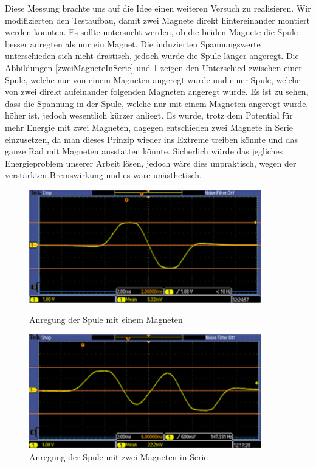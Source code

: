 Diese Messung brachte uns auf die Idee einen weiteren Versuch zu realisieren. Wir modifizierten den Testaufbau, damit zwei Magnete direkt hintereinander montiert werden konnten. Es sollte untersucht werden, ob die beiden Magnete die Spule besser anregten als nur ein Magnet. Die induzierten Spannungswerte unterschieden sich nicht drastisch, jedoch wurde die Spule länger angeregt. Die Abbildungen \ref{zweiMagneteInSerie} und \ref{manu} zeigen den Unterschied zwischen einer Spule, welche nur von einem Magneten angeregt wurde und einer Spule, welche von zwei direkt aufeinander folgenden Magneten angeregt wurde. Es ist zu sehen, dass die Spannung in der Spule, welche nur mit einem Magneten angeregt wurde, höher ist, jedoch wesentlich kürzer anliegt. Es wurde, trotz dem Potential für mehr Energie mit zwei Magneten, dagegen entschieden zwei Magnete in Serie einzusetzen, da man dieses Prinzip wieder ins Extreme treiben könnte und das ganze Rad mit Magneten ausstatten könnte. Sicherlich würde das jegliches Energieproblem unserer Arbeit lösen, jedoch wäre dies unpraktisch, wegen der verstärkten Bremswirkung und es wäre unästhetisch.

\begin{figure}[ht]
 \begin{minipage}[t]{0.5\textwidth}
  \includegraphics[width=0.9\textwidth]{3Vorgehen/imag/zweiMagneteInSerie_links.png}
  \caption{Anregung der Spule mit einem Magneten}
  \label{zweiMagneteInSerie} 
 \end{minipage}
 \begin{minipage}[t]{0.5\textwidth}
  \includegraphics[width=0.9\textwidth]{3Vorgehen/imag/zweiMagneteInSerie_rechts.png}
  \caption{Anregung der Spule mit zwei Magneten in Serie}
  \label{manu}
 \end{minipage}
\end{figure}


